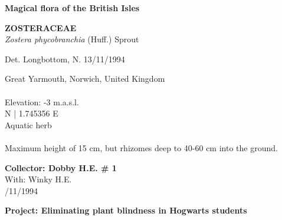 \documentclass[
]{article}
\begin{document}
\pagebreak
\begin{mdframed}[linewidth=2pt,linecolor=black, innerleftmargin = 1.5 cm, innerrightmargin = 1.5 cm]

\begin{center}
\bigskip
{\fontsize{30pt}{100pt}\selectfont\bf Magical flora of the British Isles } \\
\end{center}
\begin{flushright}
\begin{minipage}[c][20ex][c]{15em}  
\end{minipage}
\end{flushright}
\begin{flushleft}
{\fontsize{35pt}{100pt}\selectfont\bf ZOSTERACEAE  } \\
\vfill
{\fontsize{35pt}{100pt}\selectfont\emph{ Zostera phycobranchia }  (Huff.) Sprout } \\
\end{flushleft}
\begin{flushright}
{\fontsize{22.55pt}{100pt}\selectfont Det. Longbottom, N.   13/11/1994 } \\
\end{flushright}
\vfill
\bigskip
\bigskip
\begin{flushleft}
{\fontsize{25pt}{100pt}\selectfont Great Yarmouth, Norwich, United Kingdom } \\
{\fontsize{25pt}{100pt}\selectfont ~ } \\
{\fontsize{25pt}{100pt}\selectfont Elevation: -3 m.a.s.l. }\\
{\fontsize{25pt}{100pt} N  |  1.745356 E } \\
\vfill
{\fontsize{25pt}{100pt}\selectfont Aquatic herb } \\
{\fontsize{25pt}{100pt}\selectfont ~ } \\
{\fontsize{25pt}{100pt}\selectfont Maximum height of 15 cm, but rhizomes deep to 40-60 cm into the ground. } \\
\end{flushleft}
\vfill
\begin{flushright}
{\fontsize{20pt}{100pt}\selectfont\bf Collector:  Dobby H.E.  \# 1 } \\
{\fontsize{20pt}{100pt}\selectfont With:  Winky H.E. } \\
{\fontsize{20pt}{100pt}/11/1994 } \\
\end{flushright}
\vfill
\begin{center}
{\fontsize{25pt}{80pt}\selectfont\bf  Project: Eliminating plant blindness in Hogwarts students } \\
\end{center}
\end{mdframed}
\end{document}
